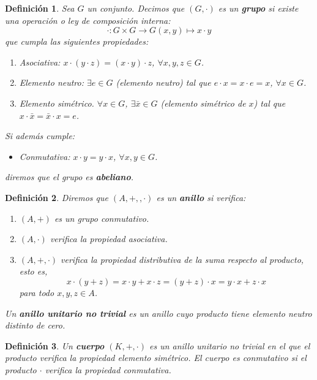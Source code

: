 \documentclass[a4paper,11pt, oneside]{book}
\newtheorem{defi}{Definición}
\begin{document}
\begin{defi}
	Sea $G$ un conjunto. Decimos que $(G,\cdot )$ es un \textbf{grupo} si existe una operación o ley de composición interna:
	\begin{equation}
	\cdot: G\times G \rightarrow G
	(x,y) \mapsto x\cdot y
	\end{equation}
	que cumpla las siguientes propiedades:
	\begin{enumerate}
		\item Asociativa: $ x\cdot (y\cdot z) = (x\cdot y)\cdot z$, $\forall x,y,z \in G$.
		\item Elemento neutro: $\exists e \in G$ (elemento neutro) tal que $e\cdot x = x\cdot e = x$, $\forall x \in G$.
		\item Elemento simétrico. $\forall x \in G$, $\exists \bar{x} \in G$ (elemento simétrico de $x$) tal que $x\cdot \bar{x} = \bar{x}\cdot x= e$.
	\end{enumerate}
	Si además cumple:
	\begin{itemize}
		\item Conmutativa: $x\cdot y = y\cdot x$, $\forall x,y \in G$.
	\end{itemize}
	diremos que el grupo es \textbf{abeliano}.
\end{defi}
\begin{defi}
	Diremos que $(A, +, ,\cdot )$ es un \textbf{anillo} si verifica:
	\begin{enumerate}
	\item $(A, +)$ es un grupo conmutativo.	
	\item $(A, \cdot )$ verifica la propiedad asociativa.
	\item $(A, +, \cdot )$ verifica la propiedad distributiva de la suma respecto al producto, esto es,
	\begin{equation}
	x\cdot (y+z) = x\cdot y +x\cdot z =
	(y+z)\cdot x = y\cdot x + z\cdot x
	\end{equation}
	para todo $x,y,z \in A$.
	\end{enumerate}
	Un \textbf{anillo unitario no trivial} es un anillo cuyo producto tiene elemento neutro distinto de cero.
\end{defi}
\begin{defi}
	Un \textbf{cuerpo} $(K, +, \cdot )$ es un anillo unitario no trivial en el que el producto verifica la propiedad elemento simétrico. El cuerpo es conmutativo si el producto $\cdot $ verifica la propiedad conmutativa.
\end{defi}
\end{document}
